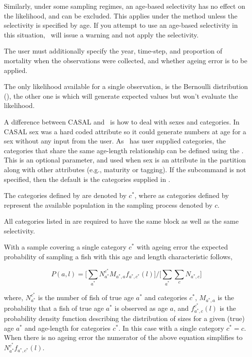 Similarly, under some sampling regimes, an age-based selectivity has no effect on the likelihood, and can be excluded. This applies under the  method unless the selectivity is specified by age. If you attempt to use an age-based selectivity in this situation, \CNAME\ will issue a warning and not apply the selectivity. 

The user must additionally specify the year, time-step, and proportion of mortality when the observations were collected, and whether ageing error is to be applied. 

The only likelihood available for a single observation, is the Bernoulli distribution (), the other one is  which will generate expected values but won't evaluate the likelihood.

A difference between CASAL and \CNAME\ is how to deal with sexes and categories. In CASAL sex was a hard coded attribute so it could generate numbers at age for a sex without any input from the user. As \CNAME\ has user supplied categories, the categories that share the same age-length relationship can be defined using the . This is an optional parameter, and used when sex is an attribute in the partition along with other attributes (e.g., maturity or tagging). If the subcommand  is not specified, then the default is the categories supplied in . 

The categories defined by  are denoted by \(c^*\), where as categories defined by  represent the available population in the sampling process denoted by \(c\).

All categories listed in  are required to have the same  block as well as the same selectivity.

With a  sample covering a single category \(c^*\) with ageing error the expected probability of sampling a fish with this age and length characteristic follows,

\[
P(a,l) = \bigg[\sum_{a^*} N^{c^*}_{a^*}M_{a^*,a}f_{a^*,c^*}(l)\bigg] / \bigg[\sum_{a^*}\sum_{c} N_{a^*,c}\bigg]
\]

where, \(N^{c^*}_{a^*}\) is the number of fish of true age \(a^*\) and categories \(c^*\), \(M_{a^*,a}\) is the probability that a fish of true age \(a^*\) is observed as age \(a\), and \(f^{c^*}_{a^*,c}(l)\) is the probability density function describing the distribution of sizes for a given (true) age \(a^*\) and age-length for categories \(c^*\). In this case with a single category \(c^* = c\). When there is no ageing error the numerator of the above equation simplifies to \(N^{c^*}_{a^*}f_{a^*,c^*}(l)\).

